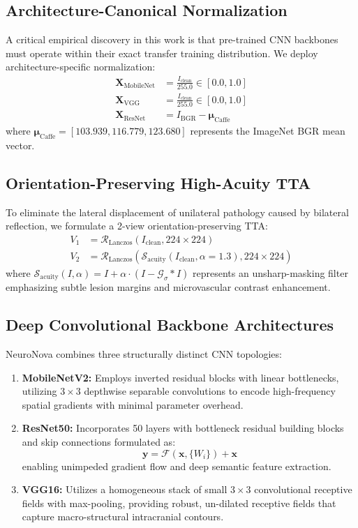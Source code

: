 \documentclass[runningheads]{llncs}
\begin{document}
\subsection{Architecture-Canonical Normalization}
A critical empirical discovery in this work is that pre-trained CNN backbones must operate within their exact transfer training distribution. We deploy architecture-specific normalization:
\begin{align}
\mathbf{X}_{\text{MobileNet}} &= \frac{I_{\text{clean}}}{255.0} \in [0.0, 1.0] \\
\mathbf{X}_{\text{VGG}}       &= \frac{I_{\text{clean}}}{255.0} \in [0.0, 1.0] \\
\mathbf{X}_{\text{ResNet}}    &= I_{\text{BGR}} - \boldsymbol{\mu}_{\text{Caffe}}
\end{align}
where $\boldsymbol{\mu}_{\text{Caffe}} = [103.939, 116.779, 123.680]$ represents the ImageNet BGR mean vector.

\subsection{Orientation-Preserving High-Acuity TTA}
To eliminate the lateral displacement of unilateral pathology caused by bilateral reflection, we formulate a 2-view orientation-preserving TTA:
\begin{align}
V_1 &= \mathcal{R}_{\text{Lanczos}}\left(I_{\text{clean}}, 224 \times 224\right) \\
V_2 &= \mathcal{R}_{\text{Lanczos}}\left(\mathcal{S}_{\text{acuity}}\left(I_{\text{clean}}, \alpha=1.3\right), 224 \times 224\right)
\end{align}
where $\mathcal{S}_{\text{acuity}}(I, \alpha) = I + \alpha \cdot (I - \mathcal{G}_{\sigma} * I)$ represents an unsharp-masking filter emphasizing subtle lesion margins and microvascular contrast enhancement.

\subsection{Deep Convolutional Backbone Architectures}
NeuroNova combines three structurally distinct CNN topologies:
\begin{enumerate}
    \item \textbf{MobileNetV2:} Employs inverted residual blocks with linear bottlenecks, utilizing $3 \times 3$ depthwise separable convolutions to encode high-frequency spatial gradients with minimal parameter overhead.
    \item \textbf{ResNet50:} Incorporates 50 layers with bottleneck residual building blocks and skip connections formulated as:
    \begin{equation}
    \mathbf{y} = \mathcal{F}(\mathbf{x}, \{W_i\}) + \mathbf{x}
    \end{equation}
    enabling unimpeded gradient flow and deep semantic feature extraction.
    \item \textbf{VGG16:} Utilizes a homogeneous stack of small $3 \times 3$ convolutional receptive fields with max-pooling, providing robust, un-dilated receptive fields that capture macro-structural intracranial contours.
\end{enumerate}
\end{document}
